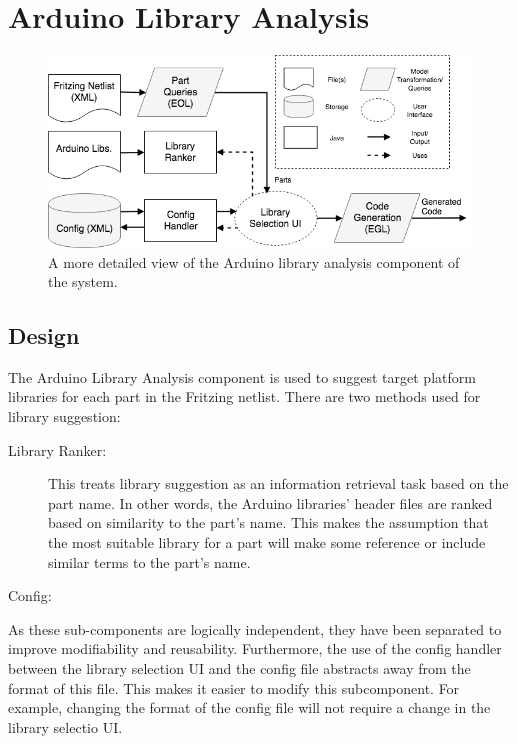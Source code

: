 \documentclass{UoYCSproject}
\begin{document}
\section{Arduino Library Analysis}
\begin{figure}[h!]
  \centering
  \includegraphics[width=0.8\linewidth]{graphics/arduino_library_analysis.png}
  \caption{A more detailed view of the Arduino library analysis component of the system.}
  \label{fig:arduino_analysis}
\end{figure}

\subsection{Design}
The Arduino Library Analysis component is used to suggest target platform libraries for each part in the Fritzing netlist. There are two methods used for library suggestion:
\begin{description}
\item[Library Ranker:] This treats library suggestion as an information retrieval task based on the part name. In other words, the Arduino libraries' header files are ranked based on similarity to the part's name. This makes the assumption that the most suitable library for a part will make some reference or include similar terms to the part's name. %
\item[Config:] %
\end{description}

As these sub-components are logically independent, they have been separated to improve modifiability and reusability. Furthermore, the use of the config handler between the library selection UI and the config file abstracts away from the format of this file. This makes it easier to modify this subcomponent. For example, changing the format of the config file will not require a change in the library selectio UI.
\end{document}
